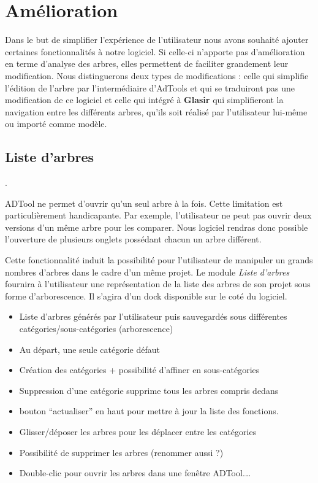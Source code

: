 \section{Amélioration}

	Dans le but de simplifier l'expérience de l'utilisateur nous avons souhaité ajouter certaines fonctionnalités à notre logiciel. Si celle-ci n'apporte pas d'amélioration en terme d'analyse des arbres, elles permettent de faciliter grandement leur modification. Nous distinguerons deux types de modifications : celle qui simplifie l'édition de l'arbre par l’intermédiaire d'AdTools et qui se traduiront pas une modification de ce logiciel et celle qui intégré à \textbf{Glasir} qui simplifieront la navigation entre les différents arbres, qu'ils soit réalisé par l'utilisateur lui-même ou importé comme modèle. 



	\subsection{Liste d'arbres}.

		ADTool ne permet d'ouvrir qu'un seul arbre à la fois. Cette limitation est particulièrement handicapante. Par exemple, l'utilisateur ne peut pas ouvrir deux versions d'un même arbre pour les comparer. Nous logiciel rendras donc possible l'ouverture de plusieurs onglets possédant chacun un arbre différent. 

		Cette fonctionnalité induit la possibilité pour l'utilisateur de manipuler un grands nombres d'arbres dans le cadre d'un même projet. Le module \emph{Liste d'arbres} fournira à l'utilisateur une représentation de la liste des arbres de son projet sous forme d'arborescence. Il s'agira d'un dock disponible sur le coté du logiciel.

		\begin{itemize}
			\item Liste d'arbres générés par l'utilisateur puis sauvegardés sous différentes catégories/sous-catégories (arborescence)
			\item Au départ, une seule catégorie défaut
			\item  Création des catégories + possibilité d'affiner en sous-catégories
			\item Suppression d'une catégorie supprime tous les arbres compris dedans
			\item bouton “actualiser” en haut pour mettre à jour la liste des fonctions.
			\item Glisser/déposer les arbres pour les déplacer entre les catégories
			\item Possibilité de supprimer les arbres (renommer aussi ?)
			\item Double-clic pour ouvrir les arbres dans une fenêtre ADTool.\ldots
		\end{itemize}
		

